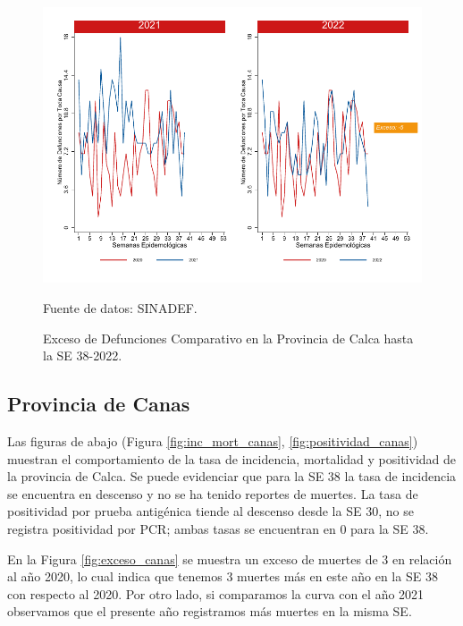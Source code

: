 \documentclass[12pt,a4paper,openany]{book}
\begin{document}
	\begin{figure}[h]
		\caption{Exceso de Defunciones Comparativo en la Provincia de Calca hasta la SE 38-2022.}\label{fig:exceso_calca}
		\begin{center}
			\includegraphics[width=0.7\linewidth]{../figuras/exceso_3.pdf}
		\end{center}
		{\footnotesize {Fuente de datos: SINADEF.}}
	\end{figure}
	
	\clearpage
	
	\subsection*{Provincia de Canas}
	\noindent Las figuras de abajo (Figura \ref{fig:inc_mort_canas}, \ref{fig:positividad_canas}) muestran el comportamiento de la tasa de incidencia, mortalidad y  positividad de  la provincia de Calca. Se puede evidenciar que para la SE 38 la tasa de incidencia se encuentra en descenso y no se ha tenido reportes de muertes. La tasa de positividad por prueba antigénica tiende al descenso desde la SE 30, no se registra positividad por PCR; ambas tasas se encuentran en 0 para la SE 38.
	
	En la Figura \ref{fig:exceso_canas} se muestra un exceso de muertes de 3 en relación al año 2020, lo cual indica que tenemos 3 muertes más en este año en la SE 38 con respecto al 2020. Por otro lado, si comparamos la curva con el año 2021 observamos que el presente año registramos más muertes en la misma SE.
	
\end{document}
